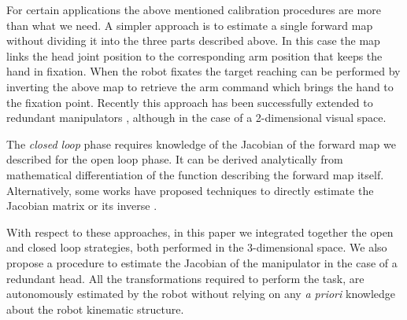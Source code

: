 For certain applications the above mentioned calibration procedures are more than
what we need. A simpler approach \cite{blackburn94learning} is to estimate a single forward map without 
dividing it into the three parts described above. In this case
the map links the head joint position to the corresponding arm position that
keeps the hand in fixation. When the robot fixates the target reaching can be 
performed by inverting the above map to retrieve the arm command which brings
the hand to the fixation point. Recently this approach has been successfully 
extended to redundant manipulators \cite{lopes06learning}, although in the 
case of a 2-dimensional visual space.

The {\em closed loop} phase requires knowledge of the Jacobian of the forward map 
we described for the open loop phase. It can be derived analytically from 
mathematical differentiation of the function describing the forward map itself. 
Alternatively, some works have proposed techniques to directly estimate the Jacobian matrix
\cite{Hosoda94versatile,Mansard06jacobian} or its inverse 
\cite{Lapreste04efficient}.

With respect to these approaches, in this paper we integrated together the 
open \cite{blackburn94learning,Mansard06jacobian} and closed 
\cite{Hosoda94versatile,lopes06learning} loop 
strategies, both performed in the 3-dimensional space.
We also propose a procedure to estimate 
the Jacobian of the manipulator in the case of a redundant head. All the 
transformations required to perform the task, are autonomously estimated by the robot 
 without relying on any \emph{a priori} knowledge about the robot 
kinematic structure.
